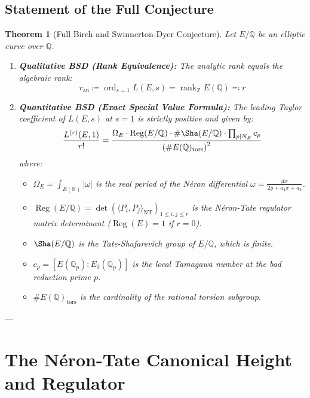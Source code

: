 \documentclass[11pt,a4paper]{article}
\newtheorem{theorem}{Theorem}[section]
\theoremstyle{definition}
\begin{document}
\subsection{Statement of the Full Conjecture}
\begin{theorem}[Full Birch and Swinnerton-Dyer Conjecture]
Let $E/\mathbb{Q}$ be an elliptic curve over $\mathbb{Q}$.
\begin{enumerate}
    \item \textbf{Qualitative BSD (Rank Equivalence):} The analytic rank equals the algebraic rank:
    \begin{equation}
    r_{\mathrm{an}} \coloneqq \operatorname{ord}_{s=1} L(E, s) = \operatorname{rank}_{\mathbb{Z}} E(\mathbb{Q}) \eqqcolon r
    \end{equation}
    \item \textbf{Quantitative BSD (Exact Special Value Formula):} The leading Taylor coefficient of $L(E,s)$ at $s=1$ is strictly positive and given by:
    \begin{equation}
    \frac{L^{(r)}(E, 1)}{r!} = \frac{\Omega_E \cdot \operatorname{Reg}(E/\mathbb{Q}) \cdot \#\Sha(E/\mathbb{Q}) \cdot \prod_{p \mid N_E} c_p}{\left(\#E(\mathbb{Q})_{\mathrm{tors}}\right)^2} \label{eq:bsd_exact}
    \end{equation}
    where:
    \begin{itemize}
        \item $\Omega_E = \int_{E(\mathbb{R})} |\omega|$ is the real period of the Néron differential $\omega = \frac{dx}{2y + a_1 x + a_3}$.
        \item $\operatorname{Reg}(E/\mathbb{Q}) = \det\left(\langle P_i, P_j \rangle_{\mathrm{NT}}\right)_{1 \le i, j \le r}$ is the Néron-Tate regulator matrix determinant ($\operatorname{Reg}(E) = 1$ if $r=0$).
        \item $\Sha(E/\mathbb{Q})$ is the Tate-Shafarevich group of $E/\mathbb{Q}$, which is finite.
        \item $c_p = [E(\mathbb{Q}_p) : E_0(\mathbb{Q}_p)]$ is the local Tamagawa number at the bad reduction prime $p$.
        \item $\#E(\mathbb{Q})_{\mathrm{tors}}$ is the cardinality of the rational torsion subgroup.
    \end{itemize}
\end{enumerate}
\end{theorem}

---

\section{The Néron-Tate Canonical Height and Regulator}
\end{document}
